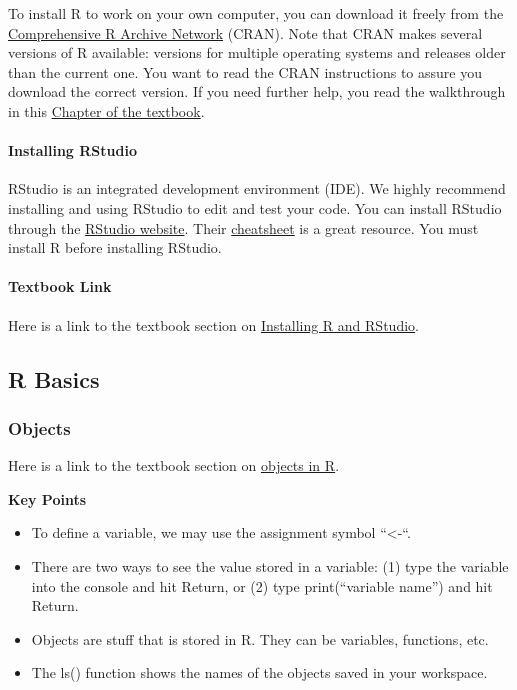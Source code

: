 \documentclass[
]{article}
\providecommand{\tightlist}{%
  \setlength{\itemsep}{0pt}\setlength{\parskip}{0pt}}
\begin{document}
To install R to work on your own computer, you can download it freely
from the \href{https://cran.r-project.org}{Comprehensive R Archive
Network} (CRAN). Note that CRAN makes several versions of R available:
versions for multiple operating systems and releases older than the
current one. You want to read the CRAN instructions to assure you
download the correct version. If you need further help, you read the
walkthrough in this
\href{https://rafalab.github.io/dsbook/installing-r-rstudio.html\#installing-r}{Chapter
of the textbook}.

\hypertarget{installing-rstudio}{%
\paragraph{Installing RStudio}\label{installing-rstudio}}

RStudio is an integrated development environment (IDE). We highly
recommend installing and using RStudio to edit and test your code. You
can install RStudio through the
\href{https://rstudio.com/products/rstudio/download/}{RStudio website}.
Their
\href{https://rstudio.com/wp-content/uploads/2016/01/rstudio-IDE-cheatsheet.pdf}{cheatsheet}
is a great resource. You must install R before installing RStudio.

\hypertarget{textbook-link}{%
\paragraph{Textbook Link}\label{textbook-link}}

Here is a link to the textbook section on
\href{https://rafalab.github.io/dsbook/installing-r-rstudio.html}{Installing
R and RStudio}.

\hypertarget{r-basics}{%
\subsection{R Basics}\label{r-basics}}

\hypertarget{objects}{%
\subsubsection{Objects}\label{objects}}

Here is a link to the textbook section on
\href{https://rafalab.github.io/dsbook/r-basics.html\#objects}{objects
in R}.

\textbf{Key Points}

\begin{itemize}
\tightlist
\item
  To define a variable, we may use the assignment symbol ``\textless-``.
\item
  There are two ways to see the value stored in a variable: (1) type the
  variable into the console and hit Return, or (2) type print(``variable
  name'') and hit Return.
\item
  Objects are stuff that is stored in R. They can be variables,
  functions, etc.
\item
  The ls() function shows the names of the objects saved in your
  workspace.
\end{itemize}
\end{document}
